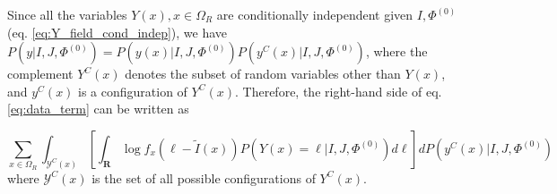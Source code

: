 Since all the variables $Y(x), x\in\Omega_{R}$ are conditionally independent given $I, \Phi^{(0)}$ (eq. \eqref{eq:Y_field_cond_indep}), we have $P(y | I, J, \Phi^{(0)}) = P(y(x)| I, J, \Phi^{(0)})P(y^{C}(x) | I, J, \Phi^{(0)})$, where the complement $Y^{C}(x)$
denotes the subset of random variables other than $Y(x)$, and $y^{C}(x)$ is a configuration of $Y^{C}(x)$. Therefore, the right-hand side of eq.\eqref{eq:data_term} can be written as

\begin{equation}\label{eq:split_integral}
    \sum_{x\in\Omega_{R}} \int_{\mathcal{Y}^{C}(x)} \left[\int_{\mathbf{R}} \log f_{x}\left(\ell - \tilde{I}(x)\right) P(Y(x) = \ell | I, J, \Phi^{(0)})d\ell\right]  dP(y^{C}(x) | I, J, \Phi^{(0)})
\end{equation}
where $\mathcal{Y}^{C}(x)$ is the set of all possible configurations of $Y^{C}(x)$.\\

